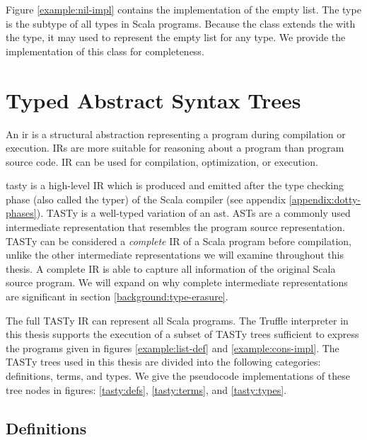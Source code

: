 Figure \ref{example:nil-impl} contains the implementation of the empty list. 
The  type is the subtype of all types in Scala programs.
Because the  class extends the  with the  type, it may used to represent the empty list for any type.
We provide the implementation of this class for completeness.

\section{Typed Abstract Syntax Trees}

An \acrfull{ir} is a structural abstraction representing a program during compilation or execution. 
IRs are more suitable for reasoning about a program than program source code. 
IR can be used for compilation\cite{llvm}, optimization\cite{llvm,ssa}, or execution\cite{java:vm-spec,clr:spec}.

\acrfull{tasty} is a high-level IR which is produced and emitted after the type checking phase (also called the typer) of the Scala compiler (see appendix \ref{appendix:dotty-phases}).
TASTy is a well-typed variation of an \acrfull{ast}.
ASTs are a commonly used intermediate representation that resembles the program source representation.
TASTy can be considered a \textit{complete} IR of a Scala program before compilation, unlike the other intermediate representations we will examine throughout this thesis.
A complete IR is able to capture all information of the original Scala source program.
We will expand on why complete intermediate representations are significant in section \ref{background:type-erasure}.

The full TASTy IR can represent all Scala programs.
The Truffle interpreter in this thesis supports the execution of a subset of TASTy trees sufficient to express the programs given in figures \ref{example:list-def} and \ref{example:cons-impl}.
The TASTy trees used in this thesis are divided into the following categories: definitions, terms, and types. 
We give the pseudocode implementations of these tree nodes in figures: \ref{tasty:defs}, \ref{tasty:terms}, and \ref{tasty:types}.

\subsection{Definitions}


